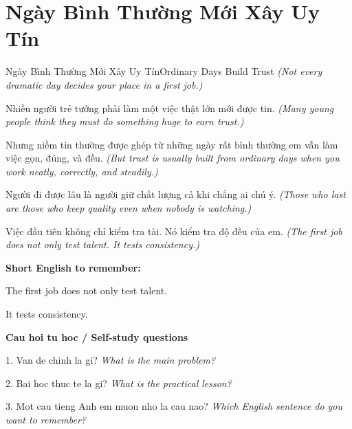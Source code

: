 \section{Ngày Bình Thường Mới Xây Uy Tín}
\begin{truyen}{Ngày Bình Thường Mới Xây Uy Tín}{Ordinary Days Build Trust}
\textit{(Not every dramatic day decides your place in a first job.)}

Nhiều người trẻ tưởng phải làm một việc thật lớn mới được tin.
\textit{(Many young people think they must do something huge to earn trust.)}

Nhưng niềm tin thường được ghép từ những ngày rất bình thường em vẫn làm việc gọn, đúng, và đều.
\textit{(But trust is usually built from ordinary days when you work neatly, correctly, and steadily.)}

Người đi được lâu là người giữ chất lượng cả khi chẳng ai chú ý.
\textit{(Those who last are those who keep quality even when nobody is watching.)}

\end{truyen}

\begin{baihoc}
Việc đầu tiên không chỉ kiểm tra tài. Nó kiểm tra độ đều của em.
\textit{(The first job does not only test talent. It tests consistency.)}
\end{baihoc}

\begin{ghinhoanh}
\textbf{Short English to remember:}

The first job does not only test talent.

It tests consistency.

\end{ghinhoanh}

\begin{tuhocnhanh}
\textbf{Cau hoi tu hoc / Self-study questions}

1. Van de chinh la gi? \textit{What is the main problem?}

2. Bai hoc thuc te la gi? \textit{What is the practical lesson?}

3. Mot cau tieng Anh em muon nho la cau nao? \textit{Which English sentence do you want to remember?}
\end{tuhocnhanh}
\ngancach

